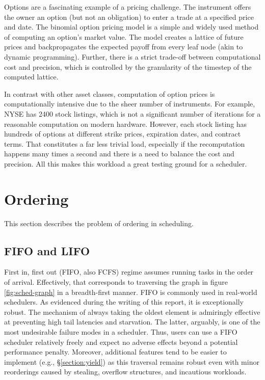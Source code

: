 \documentclass[12pt,a4paper,twoside]{report}
\begin{document}
Options are a fascinating example of a pricing challenge. The instrument offers the owner an option (but not an obligation) to enter a trade at a specified price and date. The binomial option pricing model is a simple and widely used method of computing an option's market value. The model creates a lattice of future prices and backpropagates the expected payoff from every leaf node (akin to dynamic programming). Further, there is a strict trade-off between computational cost and precision, which is controlled by the granularity of the timestep of the computed lattice.

In contrast with other asset classes, computation of option prices is computationally intensive due to the sheer number of instruments. For example, NYSE has 2400 stock listings, which is not a significant number of iterations for a reasonable computation on modern hardware. However, each stock listing has hundreds of options at different strike prices, expiration dates, and contract terms. That constitutes a far less trivial load, especially if the recomputation happens many times a second and there is a need to balance the cost and precision. All this makes this workload a great testing ground for a scheduler.

\section{Ordering}
\label{section:approaches}
This section describes the problem of ordering in scheduling.

\subsection{FIFO and LIFO}
\label{section:ordering}
First in, first out (FIFO, also FCFS) regime assumes running tasks in the order of arrival. Effectively, that corresponds to traversing the graph in figure \ref{fig:sched-graph} in a breadth-first manner. FIFO is commonly used in real-world schedulers. As evidenced during the writing of this report, it is exceptionally robust. The mechanism of always taking the oldest element is admiringly effective at preventing high tail latencies and starvation. The latter, arguably, is one of the most undesirable failure modes in a scheduler. Thus, users can use a FIFO scheduler relatively freely and expect no adverse effects beyond a potential performance penalty. Moreover, additional features tend to be easier to implement (e.g., \S\ref{section:yield}) as this traversal remains robust even with minor reorderings caused by stealing, overflow structures, and incautious workloads.
\end{document}
